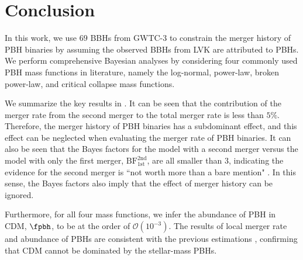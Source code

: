 \documentclass[
reprint,           %
superscriptaddress,%
amsmath,           %
amssymb,           %
aps,               %
prd,               %
notitlepage,       %
longbibliography,  %
floatfix,          %
nofootinbib,
]{revtex4-1}
\begin{document}
\section{\label{conclusion}Conclusion}

In this work, we use $69$ BBHs from GWTC-3 to constrain the merger history of PBH binaries by assuming the observed BBHs from LVK are attributed to PBHs. We perform comprehensive Bayesian analyses by considering four commonly used PBH mass functions in literature, namely the log-normal, power-law, broken power-law, and critical collapse mass functions. 

We summarize the key results in . 
It can be seen that the contribution of the merger rate from the second merger to the total merger rate is less than $5\%$.
Therefore, the merger history of PBH binaries has a subdominant effect, and this effect can be neglected when evaluating the merger rate of PBH binaries.
It can also be seen that the Bayes factors for the model with a second merger versus the model with only the first merger, $\mathrm{BF}^{\mathrm{2nd}}_{\mathrm{1st}}$, are all smaller than $3$, indicating the evidence for the second merger is ``not worth more than a bare mention" \cite{BF}. In this sense, the Bayes factors also imply that the effect of merger history can be ignored.

Furthermore, for all four mass functions, we infer the abundance of PBH in CDM, $\fpbh$, to be at the order of $\mathcal{O}(10^{-3})$. The results of local merger rate and abundance of PBHs are consistent with the previous estimations \cite{Sasaki:2016jop,Ali-Haimoud:2017rtz,Chen:2018czv,Chen:2018rzo,Chen:2019irf,Wu:2020drm,Chen:2021nxo,Chen:2022fda}, confirming that CDM cannot be dominated by the stellar-mass PBHs. 
\end{document}
